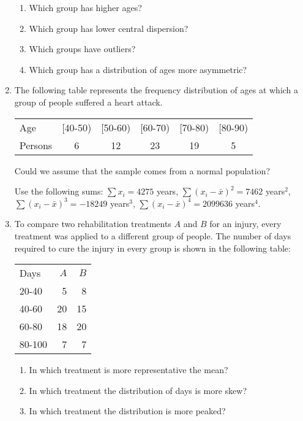 \begin{enumerate}[leftmargin=*]
\begin{enumerate}
\item Which group has higher ages?
\item Which group has lower central dispersion?
\item Which groups have outliers?
\item Which group has a distribution of ages more asymmetric?
\end{enumerate}


\item The following table represents the frequency distribution of ages at which a group of people suffered a heart
attack. 
\begin{center}
\begin{tabular}{lccccc}
\toprule
Age & [40-50) & [50-60) & [60-70) & [70-80) & [80-90)  \\ 
Persons & 6 & 12 & 23 & 19 & 5  \\ 
\bottomrule
\end{tabular}
\end{center}

Could we assume that the sample comes from a normal population?

Use the following sums: $\sum x_i= 4275$ years, $\sum (x_i-\bar x)^2=7462$ years$^2$, $\sum (x_i-\bar x)^3=-18249$
years$^3$, $\sum (x_i-\bar x)^4=2099636$ years$^4$.

\item To compare two rehabilitation treatments $A$ and $B$ for an injury, every treatment was applied to a different
group of people. The number of days required to cure the injury in every group is shown in the following table:
\begin{center}
\begin{tabular}{lrr}
\toprule
Days & $A$ & $B$ \\
20-40 & 5 & 8 \\
40-60 & 20 & 15 \\
60-80 & 18 & 20 \\
80-100 & 7 & 7 \\
\bottomrule
\end{tabular}
\end{center}

\begin{enumerate}
\item In which treatment is more representative the mean?
\item In which treatment the distribution of days is more skew? 
\item In which treatment the distribution is more peaked?
\end{enumerate}


\end{enumerate}
